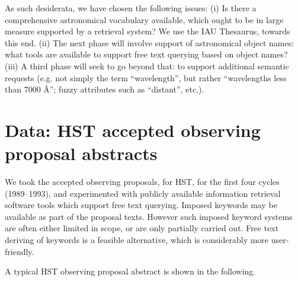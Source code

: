 As such desiderata, we have chosen the following issues: (i) Is there a 
comprehensive astronomical vocabulary available, which ought to be in 
large measure supported by a retrieval system?  We use the IAU Thesaurus,
towards this end.  (ii) The next phase will involve support of astronomical
object names: what tools are available to support free text querying based 
on object names?  (iii) A third phase will seek to go beyond that: to 
support additional semantic requests (e.g. not simply the term ``wavelength'',
but rather ``wavelengths less than 7000 
\AA''; fuzzy attributes such as ``distant'', etc.).


\section{Data: HST accepted observing proposal abstracts}

We took the accepted observing proposals, for HST, for the first
four cycles (1989--1993), and experimented with publicly available 
information retrieval software tools which support free text querying.  
Imposed keywords may be available as part of the proposal texts.  However
such imposed keyword systems are often either limited in scope, or are only
partially carried out. Free text deriving of keywords is a feasible 
alternative, which is considerably more user-friendly. 

A typical HST observing proposal abstract is shown in the following.

